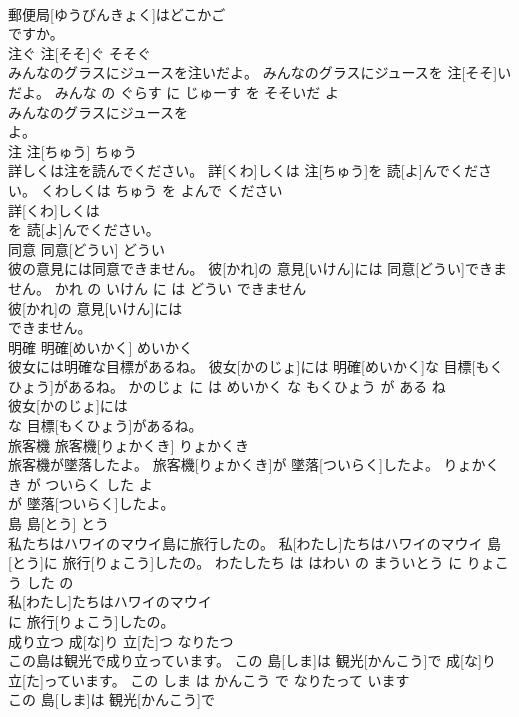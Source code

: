 \documentclass[8pt]{extreport}
\begin{document}
\begin{CJK}{UTF8}{min}
\\	郵便局[ゆうびんきょく]はどこかご
\\	ですか。			
\\	注ぐ	注[そそ]ぐ	そそぐ	
\\	みんなのグラスにジュースを注いだよ。	みんなのグラスにジュースを 注[そそ]いだよ。	みんな の ぐらす に じゅーす を そそいだ よ	
\\	みんなのグラスにジュースを
\\	よ。			
\\	注	注[ちゅう]	ちゅう	
\\	詳しくは注を読んでください。	詳[くわ]しくは 注[ちゅう]を 読[よ]んでください。	くわしくは ちゅう を よんで ください	
\\	詳[くわ]しくは
\\	を 読[よ]んでください。			
\\	同意	同意[どうい]	どうい	
\\	彼の意見には同意できません。	彼[かれ]の 意見[いけん]には 同意[どうい]できません。	かれ の いけん に は どうい できません	
\\	彼[かれ]の 意見[いけん]には
\\	できません。			
\\	明確	明確[めいかく]	めいかく	
\\	彼女には明確な目標があるね。	彼女[かのじょ]には 明確[めいかく]な 目標[もくひょう]があるね。	かのじょ に は めいかく な もくひょう が ある ね	
\\	彼女[かのじょ]には
\\	な 目標[もくひょう]があるね。			
\\	旅客機	旅客機[りょかくき]	りょかくき	
\\	旅客機が墜落したよ。	旅客機[りょかくき]が 墜落[ついらく]したよ。	りょかくき が ついらく した よ	
\\	が 墜落[ついらく]したよ。			
\\	島	島[とう]	とう	
\\	私たちはハワイのマウイ島に旅行したの。	私[わたし]たちはハワイのマウイ 島[とう]に 旅行[りょこう]したの。	わたしたち は はわい の まういとう に りょこう した の	
\\	私[わたし]たちはハワイのマウイ
\\	に 旅行[りょこう]したの。			
\\	成り立つ	成[な]り 立[た]つ	なりたつ	
\\	この島は観光で成り立っています。	この 島[しま]は 観光[かんこう]で 成[な]り 立[た]っています。	この しま は かんこう で なりたって います	
\\	この 島[しま]は 観光[かんこう]で

\end{CJK}
\end{document}
